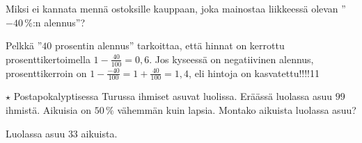 \begin{tehtavasivu}
\begin{tehtava}
Miksi ei kannata mennä ostoksille kauppaan, joka mainostaa liikkeessä olevan ''$-40$\,\%:n alennus''?
	\begin{vastaus}
	Pelkkä ''$40$ prosentin alennus'' tarkoittaa, että hinnat on kerrottu prosenttikertoimella $1-\frac{40}{100}=0,6$. Jos kyseessä on negatiivinen alennus, prosenttikerroin on $1-\frac{-40}{100}=1+\frac{40}{100}=1,4$, eli hintoja on kasvatettu!!!!11
	\end{vastaus}
\end{tehtava}

\begin{tehtava} 
		$\star$ Postapokalyptisessa Turussa ihmiset asuvat luolissa. Eräässä luolassa asuu $99$ ihmistä. Aikuisia on $50\,\%$ vähemmän kuin lapsia. Montako aikuista luolassa asuu?
	\begin{vastaus}
	Luolassa asuu $33$ aikuista.
	\end{vastaus}
\end{tehtava}


\end{tehtavasivu}